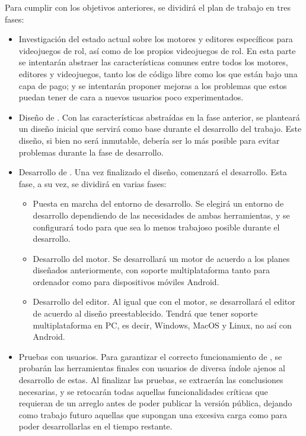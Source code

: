 Para cumplir con los objetivos anteriores, se dividirá el plan de trabajo en tres fases:
\begin{itemize}
	\item Investigación del estado actual sobre los motores y editores específicos para videojuegos de rol, así como de los propios videojuegos de rol. En esta parte se intentarán abstraer las características comunes entre todos los motores, editores y videojuegos, tanto los de código libre como los que están bajo una capa de pago; y se intentarán proponer mejoras a los problemas que estos puedan tener de cara a nuevos usuarios poco experimentados.
	\item Diseño de \baker. Con las características abstraídas en la fase anterior, se planteará un diseño inicial que servirá como base durante el desarrollo del trabajo. Este diseño, si bien no será inmutable, debería ser lo más  posible para evitar problemas durante la fase de desarrollo.
	\item Desarrollo de \baker. Una vez finalizado el diseño, comenzará el desarrollo. Esta fase, a su vez, se dividirá en varias fases:
		\begin{itemize}
			\item Puesta en marcha del entorno de desarrollo. Se elegirá un entorno de desarrollo dependiendo de las necesidades de ambas herramientas, y se configurará todo para que sea lo menos trabajoso posible durante el desarrollo. 
			\item Desarrollo del motor. Se desarrollará un motor de acuerdo a los planes diseñados anteriormente, con soporte multiplataforma tanto para ordenador como para dispositivos móviles Android.
			\item Desarrollo del editor. Al igual que con el motor, se desarrollará el editor de acuerdo al diseño preestablecido. Tendrá que tener soporte multiplataforma en PC, es decir, Windows, MacOS y Linux, no así con Android.
		\end{itemize}
	\item Pruebas con usuarios. Para garantizar el correcto funcionamiento de \baker, se probarán las herramientas finales con usuarios de diversa índole ajenos al desarrollo de estas. Al finalizar las pruebas, se extraerán las conclusiones necesarias, y se retocarán todas aquellas funcionalidades críticas que requieran de un arreglo antes de poder publicar la versión pública, dejando como trabajo futuro aquellas que supongan una excesiva carga como para poder desarrollarlas en el tiempo restante.
\end{itemize}


